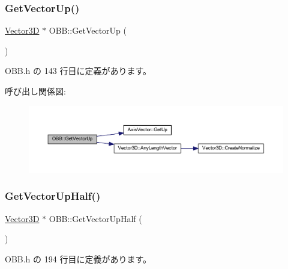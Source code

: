 \subsubsection{\texorpdfstring{Get\+Vector\+Up()}{GetVectorUp()}}
{\footnotesize\ttfamily \mbox{\hyperlink{class_vector3_d}{Vector3D}} $\ast$ O\+B\+B\+::\+Get\+Vector\+Up (\begin{DoxyParamCaption}{ }\end{DoxyParamCaption})\hspace{0.3cm}{\ttfamily [inline]}}



 O\+B\+B.\+h の 143 行目に定義があります。

呼び出し関係図\+:\nopagebreak
\begin{figure}[H]
\begin{center}
\leavevmode
\includegraphics[width=350pt]{class_o_b_b_a0c0fd050224beb2c196e923e177bc0d5_cgraph}
\end{center}
\end{figure}
\mbox{\label{class_o_b_b_a48255d7b9af2d2ea109de41787c30a3a}} 
\subsubsection{\texorpdfstring{Get\+Vector\+Up\+Half()}{GetVectorUpHalf()}}
{\footnotesize\ttfamily \mbox{\hyperlink{class_vector3_d}{Vector3D}} $\ast$ O\+B\+B\+::\+Get\+Vector\+Up\+Half (\begin{DoxyParamCaption}{ }\end{DoxyParamCaption})\hspace{0.3cm}{\ttfamily [inline]}}



 O\+B\+B.\+h の 194 行目に定義があります。

